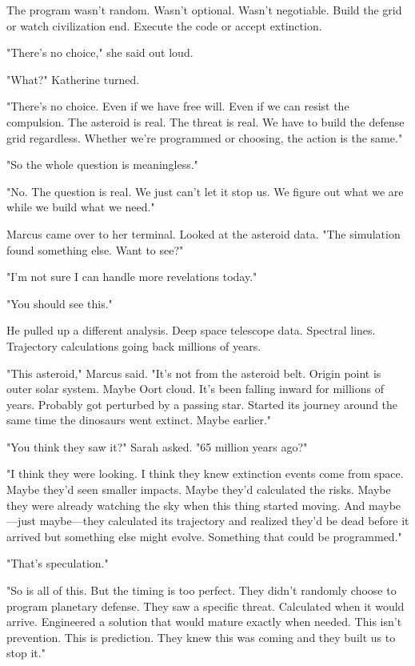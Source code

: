 The program wasn't random. Wasn't optional. Wasn't negotiable. Build the grid or watch civilization end. Execute the code or accept extinction.

"There's no choice," she said out loud.

"What?" Katherine turned.

"There's no choice. Even if we have free will. Even if we can resist the compulsion. The asteroid is real. The threat is real. We have to build the defense grid regardless. Whether we're programmed or choosing, the action is the same."

"So the whole question is meaningless."

"No. The question is real. We just can't let it stop us. We figure out what we are while we build what we need."

Marcus came over to her terminal. Looked at the asteroid data. "The simulation found something else. Want to see?"

"I'm not sure I can handle more revelations today."

"You should see this."

He pulled up a different analysis. Deep space telescope data. Spectral lines. Trajectory calculations going back millions of years.

"This asteroid," Marcus said. "It's not from the asteroid belt. Origin point is outer solar system. Maybe Oort cloud. It's been falling inward for millions of years. Probably got perturbed by a passing star. Started its journey around the same time the dinosaurs went extinct. Maybe earlier."

"You think they saw it?" Sarah asked. "65 million years ago?"

"I think they were looking. I think they knew extinction events come from space. Maybe they'd seen smaller impacts. Maybe they'd calculated the risks. Maybe they were already watching the sky when this thing started moving. And maybe—just maybe—they calculated its trajectory and realized they'd be dead before it arrived but something else might evolve. Something that could be programmed."

"That's speculation."

"So is all of this. But the timing is too perfect. They didn't randomly choose to program planetary defense. They saw a specific threat. Calculated when it would arrive. Engineered a solution that would mature exactly when needed. This isn't prevention. This is prediction. They knew this was coming and they built us to stop it."

